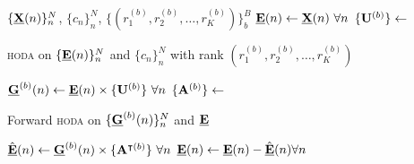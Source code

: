 \begin{algorithmic}[1]
  \Require $\{\underline{\mathbf{X}}(n)\}_n^N$, $\{c_n\}_n^N$,
  $\{(r_1^{(b)},r_2^{(b)},\ldots,r_K^{(b)})\}_b^B$
  \State $\underline{\mathbf{E}}(n)\gets\underline{\mathbf{X}}(n)\ \forall n$
  \State $\{\mathbf{U}^{(b)}\}\gets$ \parbox[t]{5cm}{\textsc{hoda} on $\{\underline{\mathbf{E}}(n)\}_n^N$ and
  $\{c_n\}_n^N$ with rank $(r_1^{(b)},r_2^{(b)},\ldots,r_K^{(b)})$}
  \State $\underline{\mathbf{G}}^{(b)}(n)\gets\underline{\mathbf{E}}(n)\times\{\mathbf{U}^{(b)}\}\
  \forall n$
  \State $\{\mathbf{A}^{(b)}\}\gets$ \parbox[t]{5cm}{Forward \textsc{hoda} on
  $\{\underline{\mathbf{G}}^{(b)}(n)\}_n^N$ and $\underline{\mathbf{E}}$}
  \State
  $\hat{\underline{\mathbf{E}}}(n)\gets\underline{\mathbf{G}}^{(b)}(n)\times\{\mathbf{A}^{\intercal(b)}\}\
  \forall n$
  \State
  $\underline{\mathbf{E}}(n)\gets \underline{\mathbf{E}}(n) - \hat{\underline{\mathbf{E}}}(n) \forall n$

  \EndFor
\end{algorithmic}
